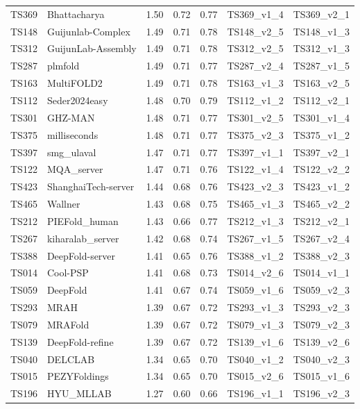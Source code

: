 \begin{table}[ht]
{\begin{tabular}{llrrrll}
TS369 & Bhattacharya & 1.50 & 0.72 & 0.77 & TS369\_v1\_4 & TS369\_v2\_1 \\ 
TS148 & Guijunlab-Complex & 1.49 & 0.71 & 0.78 & TS148\_v2\_5 & TS148\_v1\_3 \\ 
TS312 & GuijunLab-Assembly & 1.49 & 0.71 & 0.78 & TS312\_v2\_5 & TS312\_v1\_3 \\ 
TS287 & plmfold & 1.49 & 0.71 & 0.77 & TS287\_v2\_4 & TS287\_v1\_5 \\ 
TS163 & MultiFOLD2 & 1.49 & 0.71 & 0.78 & TS163\_v1\_3 & TS163\_v2\_5 \\ 
TS112 & Seder2024easy & 1.48 & 0.70 & 0.79 & TS112\_v1\_2 & TS112\_v2\_1 \\ 
TS301 & GHZ-MAN & 1.48 & 0.71 & 0.77 & TS301\_v2\_5 & TS301\_v1\_4 \\ 
TS375 & milliseconds & 1.48 & 0.71 & 0.77 & TS375\_v2\_3 & TS375\_v1\_2 \\ 
TS397 & smg\_ulaval & 1.47 & 0.71 & 0.77 & TS397\_v1\_1 & TS397\_v2\_1 \\ 
TS122 & MQA\_server & 1.47 & 0.71 & 0.76 & TS122\_v1\_4 & TS122\_v2\_2 \\ 
TS423 & ShanghaiTech-server & 1.44 & 0.68 & 0.76 & TS423\_v2\_3 & TS423\_v1\_2 \\ 
TS465 & Wallner & 1.43 & 0.68 & 0.75 & TS465\_v1\_3 & TS465\_v2\_2 \\ 
TS212 & PIEFold\_human & 1.43 & 0.66 & 0.77 & TS212\_v1\_3 & TS212\_v2\_1 \\ 
TS267 & kiharalab\_server & 1.42 & 0.68 & 0.74 & TS267\_v1\_5 & TS267\_v2\_4 \\ 
TS388 & DeepFold-server & 1.41 & 0.65 & 0.76 & TS388\_v1\_2 & TS388\_v2\_3 \\ 
TS014 & Cool-PSP & 1.41 & 0.68 & 0.73 & TS014\_v2\_6 & TS014\_v1\_1 \\ 
TS059 & DeepFold & 1.41 & 0.67 & 0.74 & TS059\_v1\_6 & TS059\_v2\_3 \\ 
TS293 & MRAH & 1.39 & 0.67 & 0.72 & TS293\_v1\_3 & TS293\_v2\_3 \\ 
TS079 & MRAFold & 1.39 & 0.67 & 0.72 & TS079\_v1\_3 & TS079\_v2\_3 \\ 
TS139 & DeepFold-refine & 1.39 & 0.67 & 0.72 & TS139\_v1\_6 & TS139\_v2\_6 \\ 
TS040 & DELCLAB & 1.34 & 0.65 & 0.70 & TS040\_v1\_2 & TS040\_v2\_3 \\ 
TS015 & PEZYFoldings & 1.34 & 0.65 & 0.70 & TS015\_v2\_6 & TS015\_v1\_6 \\ 
TS196 & HYU\_MLLAB & 1.27 & 0.60 & 0.66 & TS196\_v1\_1 & TS196\_v2\_3 \\ 

\end{tabular}}
\end{table}
